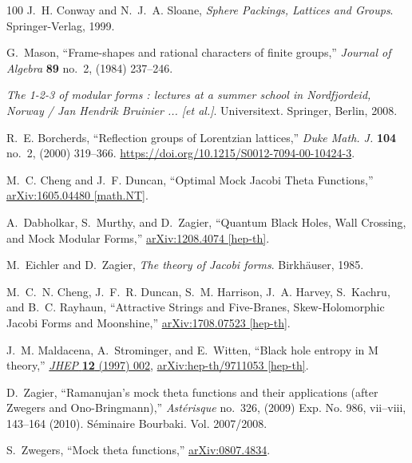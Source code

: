 \documentclass[11pt,a4paper,fontset=windows]{ctexart}
\numberwithin{equation}{section}
\begin{document}
\begin{thebibliography}{100}
J.~H. Conway and N.~J.~A. Sloane, {\em {Sphere Packings, Lattices and Groups}}.
\newblock Springer-Verlag, 1999.

G.~Mason, ``Frame-shapes and rational characters of finite groups,'' {\em
  Journal of Algebra} {\bfseries 89} no.~2, (1984) 237--246.

{\em The 1-2-3 of modular forms : lectures at a summer school in Nordfjordeid,
  Norway / Jan Hendrik Bruinier ... [et al.]}.
\newblock Universitext. Springer, Berlin, 2008.

R.~E. Borcherds, ``Reflection groups of {L}orentzian lattices,'' {\em Duke
  Math. J.} {\bfseries 104} no.~2, (2000) 319--366.
  \url{https://doi.org/10.1215/S0012-7094-00-10424-3}.

M.~C. Cheng and J.~F. Duncan, ``{Optimal Mock Jacobi Theta Functions},''
  \href{http://arxiv.org/abs/1605.04480}{{\ttfamily arXiv:1605.04480
  [math.NT]}}.

A.~Dabholkar, S.~Murthy, and D.~Zagier, ``{Quantum Black Holes, Wall Crossing,
  and Mock Modular Forms},''
\href{http://arxiv.org/abs/1208.4074}{{\ttfamily arXiv:1208.4074 [hep-th]}}.

M.~Eichler and D.~Zagier, {\em {The theory of Jacobi forms}}.
\newblock Birkh{\"a}user, 1985.

M.~C.~N. Cheng, J.~F.~R. Duncan, S.~M. Harrison, J.~A. Harvey, S.~Kachru, and
  B.~C. Rayhaun, ``{Attractive Strings and Five-Branes, Skew-Holomorphic Jacobi
  Forms and Moonshine},''
\href{http://arxiv.org/abs/1708.07523}{{\ttfamily arXiv:1708.07523 [hep-th]}}.

J.~M. Maldacena, A.~Strominger, and E.~Witten, ``{Black hole entropy in M
  theory},'' \href{http://dx.doi.org/10.1088/1126-6708/1997/12/002}{{\em JHEP}
  {\bfseries 12} (1997) 002},
\href{http://arxiv.org/abs/hep-th/9711053}{{\ttfamily arXiv:hep-th/9711053
  [hep-th]}}.

D.~Zagier, ``Ramanujan's mock theta functions and their applications (after
  {Z}wegers and {O}no-{B}ringmann),'' {\em Ast\'erisque} no.~326, (2009) Exp.
  No. 986, vii--viii, 143--164 (2010). S{\'e}minaire Bourbaki. Vol. 2007/2008.

S.~Zwegers, ``Mock theta functions,''
  \href{http://arxiv.org/abs/arXiv:0807.4834}{{\ttfamily arXiv:0807.4834}}.


\end{thebibliography}
\end{document}
